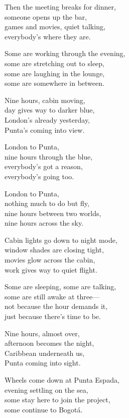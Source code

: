 \begin{lyrics}
Then the meeting breaks for dinner,\\
someone opens up the bar,\\
games and movies, quiet talking,\\
everybody's where they are.

Some are working through the evening,\\
some are stretching out to sleep,\\
some are laughing in the lounge,\\
some are somewhere in between.


Nine hours, cabin moving,\\
day gives way to darker blue,\\
London's already yesterday,\\
Punta's coming into view.


London to Punta,\\
nine hours through the blue,\\
everybody's got a reason,\\
everybody's going too.

London to Punta,\\
nothing much to do but fly,\\
nine hours between two worlds,\\
nine hours across the sky.


Cabin lights go down to night mode,\\
window shades are closing tight,\\
movies glow across the cabin,\\
work gives way to quiet flight.

Some are sleeping, some are talking,\\
some are still awake at three—\\
not because the hour demands it,\\
just because there's time to be.


Nine hours, almost over,\\
afternoon becomes the night,\\
Caribbean underneath us,\\
Punta coming into sight.


Wheels come down at Punta Espada,\\
evening settling on the sea,\\
some stay here to join the project,\\
some continue to Bogotá.


\end{lyrics}
